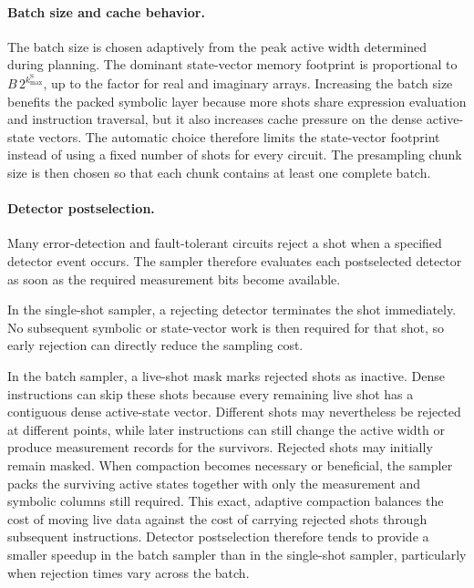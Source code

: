 \documentclass[a4paper,onecolumn,unpublished]{quantumarticle}
\begin{document}
\paragraph{Batch size and cache behavior.}
The batch size is chosen adaptively from the peak active width determined during planning.
The dominant state-vector memory footprint is proportional to
$B\,2^{k_{\max}^{\mathrm S}}$, up to the factor for real and imaginary
arrays.
Increasing the batch size benefits the packed symbolic layer because more shots share expression evaluation and instruction traversal, but it also increases cache pressure on the dense active-state vectors.
The automatic choice therefore limits the state-vector footprint instead of using a fixed number of shots for every circuit.
The presampling chunk size is then chosen so that each chunk contains at least one complete batch.

\paragraph{Detector postselection.}
Many error-detection and fault-tolerant circuits reject a shot when a specified detector event occurs.
The sampler therefore evaluates each postselected detector as soon as the required measurement bits become available.

In the single-shot sampler, a rejecting detector terminates the shot immediately.
No subsequent symbolic or state-vector work is then required for that shot, so early rejection can directly reduce the sampling cost.

In the batch sampler, a live-shot mask marks rejected shots as inactive.
Dense instructions can skip these shots because every remaining live shot has a contiguous dense active-state vector.
Different shots may nevertheless be rejected at different points, while later instructions can still change the active width or produce measurement records for the survivors.
Rejected shots may initially remain masked.
When compaction becomes necessary or beneficial, the sampler packs the surviving active states together with only the measurement and symbolic columns still required.
This exact, adaptive compaction balances the cost of moving live data against the cost of carrying rejected shots through subsequent instructions.
Detector postselection therefore tends to provide a smaller speedup in the batch sampler than in the single-shot sampler, particularly when rejection times vary across the batch.
\end{document}
